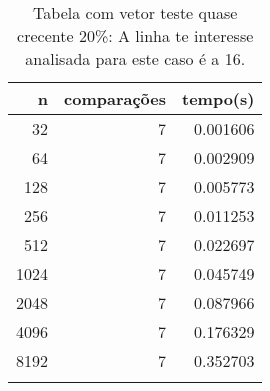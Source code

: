 \begin{table}[ht]
\centering
\begin{tabular}{rrr} \toprule
        n &    comparações &       tempo(s) \\ \midrule
      32  &              7 &      0.001606 \\
      64  &              7 &      0.002909 \\
     128  &              7 &      0.005773 \\
     256  &              7 &      0.011253 \\
     512  &              7 &      0.022697 \\
    1024  &              7 &      0.045749 \\
    2048  &              7 &      0.087966 \\
    4096  &              7 &      0.176329 \\
    8192  &              7 &      0.352703 \\
\bottomrule\addlinespace
\end{tabular}
\caption{Tabela com vetor teste quase crecente 20\%: A linha te interesse analisada para este caso é a 16.}
\label{tab:radixsortQuaseCresc20}
\end{table}
